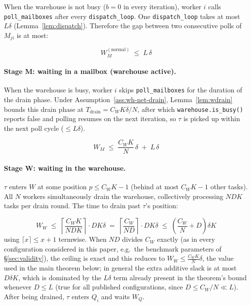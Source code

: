 \documentclass[11pt,a4paper]{article}
\newcommand{\ceil}[1]{\left\lceil #1 \right\rceil}
\newcommand{\code}[1]{\texttt{#1}}
\begin{document}
When the warehouse is not busy ($b=0$ in every iteration),
worker $i$ calls \code{poll\_mailboxes} after every
\code{dispatch\_loop}.  One \code{dispatch\_loop} takes at most
$L\delta$ (Lemma~\ref{lem:dispatch}).  Therefore the gap between
two consecutive polls of $M_{ji}$ is at most:

\[
  W_M^{(\text{normal})} \;\leq\; L\,\delta
\]

\paragraph{Stage M: waiting in a mailbox (warehouse active).}

When the warehouse is busy, worker $i$ skips \code{poll\_mailboxes}
for the duration of the drain phase.  Under
Assumption~\ref{ass:wh-net-drain}, Lemma~\ref{lem:wdrain} bounds this
drain phase at $T_{\mathrm{drain}} = C_W K\delta/N$, after which
\code{warehouse.is\_busy()} reports false and polling resumes on the
next iteration, so $\tau$ is picked up within the next poll cycle
($\leq L\delta$).

\[
  W_M \;\leq\; \frac{C_W K}{N}\,\delta \;+\; L\,\delta
\]

\paragraph{Stage W: waiting in the warehouse.}

$\tau$ enters $W$ at some position $p \leq C_W K - 1$ (behind at
most $C_W K - 1$ other tasks).  All $N$ workers simultaneously
drain the warehouse, collectively processing $NDK$ tasks per drain
round.  The time to drain past $\tau$'s position:

\[
  W_W \;\leq\; \ceil{\frac{C_W K}{NDK}} \cdot DK\delta
       \;=\; \ceil{\frac{C_W}{ND}} \cdot DK\delta
       \;\leq\; \left(\frac{C_W}{N} + D\right)\delta K
\]
using $\lceil x \rceil \le x+1$ termwise. When $ND$ divides $C_W$
exactly (as in every configuration considered in this paper, e.g.\ the
benchmark parameters of \S\ref{sec:validity}), the ceiling is exact and
this reduces to $W_W \leq \frac{C_WK}{N}\delta$, the value used in the
main theorem below; in general the extra additive slack is at most
$D\delta K$, which is dominated by the $L\delta$ term already present
in the theorem's bound whenever $D \leq L$ (true for all published
configurations, since $D \le C_W/N \ll L$).
After being drained, $\tau$ enters $Q_i$ and waits $W_Q$.

\end{document}
